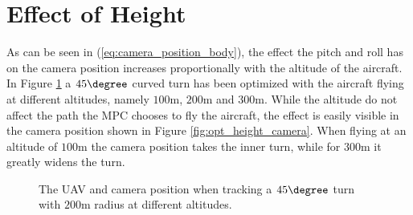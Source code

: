 \section{Effect of Height}

As can be seen in (\ref{eq:camera_position_body}), the effect the pitch and roll has on the camera position increases proportionally with the altitude of the aircraft. In Figure \ref{fig:opt_height} a $45\degree$ curved turn has been optimized with the aircraft flying at different altitudes, namely $100$m, $200$m and $300$m. While the altitude do not affect the path the MPC chooses to fly the aircraft, the effect is easily visible in the camera position shown in Figure \ref{fig:opt_height_camera}. When flying at an altitude of $100$m the camera position takes the inner turn, while for $300$m it greatly widens the turn. 

\begin{figure}
	\caption{The UAV and camera position when tracking a $45\degree$ turn with $200$m radius at different altitudes.}
	\label{fig:opt_height}
\end{figure}
